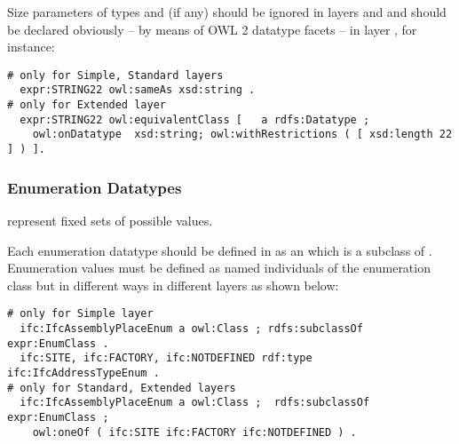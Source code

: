 \begin{principle}%
Size parameters of types  and  (if any) should be ignored in layers \simple{} and \standard{} and should be declared obviously -- by means of OWL 2 data\-type facets -- in layer \extended{}, for instance:


\begin{lstlisting}
# only for Simple, Standard layers
  expr:STRING22 owl:sameAs xsd:string .
# only for Extended layer
  expr:STRING22 owl:equivalentClass [   a rdfs:Datatype ;
    owl:onDatatype  xsd:string; owl:withRestrictions ( [ xsd:length 22 ] ) ].
\end{lstlisting}
\end{principle}


\subsubsection{Enumeration Datatypes} represent fixed sets of possible values. 

\begin{principle}%
Each enumeration data\-type should be defined in \ifcowl{} as an  which is a subclass of . Enumeration values must be defined as named individuals of the enumeration class but in different ways in different layers as shown below:

\begin{lstlisting}
# only for Simple layer
  ifc:IfcAssemblyPlaceEnum a owl:Class ; rdfs:subclassOf expr:EnumClass .
  ifc:SITE, ifc:FACTORY, ifc:NOTDEFINED rdf:type ifc:IfcAddressTypeEnum .
# only for Standard, Extended layers
  ifc:IfcAssemblyPlaceEnum a owl:Class ;  rdfs:subclassOf expr:EnumClass ;
    owl:oneOf ( ifc:SITE ifc:FACTORY ifc:NOTDEFINED ) .
\end{lstlisting}
\end{principle}


